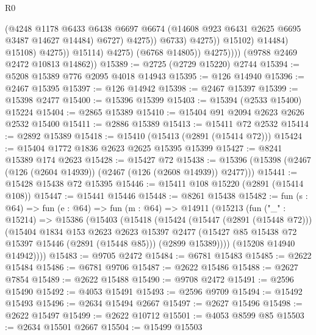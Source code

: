 \begin{lexlean}{R0}
\begin{coremodule}
                                        (@4248
                                          @1178
                                          @6433
                                          @6438
                                          @6697
                                          @6674
                                          (@14608 @923 @6431 @2625 @6695 @3487 @14627 @14484)
                                          @6727)
                                        @4275))
                                    @6733)
                                  @4275))
                              @15102)
                            @14484)
                          @15108)
                        @4275))
                    @15114)
                  @4275)
                (@6768 @14805))
              @4275))))
      (@9788 @2469 @2472 @10813 @14862))
@15389 := @2725 (@2729 @15220) @2744
@15394 := @5208 @15389 @776 @2095 @4018 @14943
@15395 := @126 @14940
@15396 := @2467 @15395
@15397 := @126 @14942
@15398 := @2467 @15397
@15399 := @15398 @2477
@15400 := @15396 @15399
@15403 := @15394 (@2533 @15400) @15224
@15404 := @2865 @15389
@15410 := @15404 @91 @2094 @2623 @2626 @2532 @15400
@15411 := @2886 @15389
@15413 := @15411 @72 @2532
@15414 := @2892 @15389
@15418 := @15410 (@15413 (@2891 (@15414 @72)))
@15424 := @15404 @1772 @1836 @2623 @2625 @15395 @15399
@15427 := @8241 @15389 @174 @2623
@15428 := @15427 @72
@15438 := @15396 (@15398 (@2467 (@126 (@2604 @14939)) (@2467 (@126 (@2608 @14939)) @2477)))
@15441 := @15428 @15438 @72 @15395
@15446 := @15411 @108 @15220 (@2891 (@15414 @108))
@15447 := @15441 @15446
@15448 := @8261 @15438
@15482 := fun (s : @64) =>
  fun (e : @64) =>
  fun (m : @64) =>
  @14911
    (@15213
      (fun ("_" : @15214) =>
      @15386
        (@15403
          (@15418
            (@15424
              (@15447 (@2891 (@15448 @72)))
              (@15404
                @1834
                @153
                @2623
                @2623
                @15397
                @2477
                (@15427 @85 @15438 @72 @15397 @15446 (@2891 (@15448 @85)))
                (@2899 @15389))))
          (@15208 @14940 @14942))))
@15483 := @9705 @2472
@15484 := @6781 @15483
@15485 := @2622 @15484
@15486 := @6781 @9706
@15487 := @2622 @15486
@15488 := @2627 @7854
@15489 := @2622 @15488
@15490 := @9708 @2472
@15491 := @2596 @15490
@15492 := @4053 @15491
@15493 := @2596 @9709
@15494 := @15492 @15493
@15496 := @2634 @15494 @2667
@15497 := @2627 @15496
@15498 := @2622 @15497
@15499 := @2622 @10712
@15501 := @4053 @8599 @85
@15503 := @2634 @15501 @2667
@15504 := @15499 @15503

\end{coremodule}
\end{lexlean}
